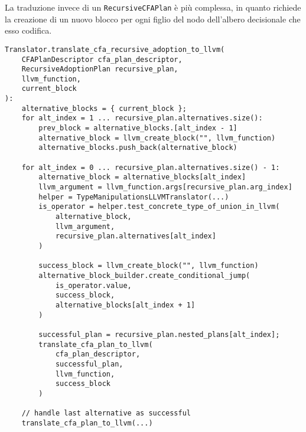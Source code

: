 La traduzione invece di un \texttt{RecursiveCFAPlan} è più complessa, in quanto
richiede la creazione di un nuovo blocco per ogni figlio del nodo dell'albero 
decisionale che esso codifica. \\

\vspace{0.4cm}
\begin{lstlisting}[frame=single]
Translator.translate_cfa_recursive_adoption_to_llvm(
    CFAPlanDescriptor cfa_plan_descriptor, 
    RecursiveAdoptionPlan recursive_plan,
    llvm_function,
    current_block
):
    alternative_blocks = { current_block };
    for alt_index = 1 ... recursive_plan.alternatives.size():
        prev_block = alternative_blocks.[alt_index - 1]
        alternative_block = llvm_create_block("", llvm_function)
        alternative_blocks.push_back(alternative_block)

    for alt_index = 0 ... recursive_plan.alternatives.size() - 1:
        alternative_block = alternative_blocks[alt_index]
        llvm_argument = llvm_function.args[recursive_plan.arg_index]
        helper = TypeManipulationsLLVMTranslator(...)
        is_operator = helper.test_concrete_type_of_union_in_llvm(
            alternative_block, 
            llvm_argument, 
            recursive_plan.alternatives[alt_index]
        )
        
        success_block = llvm_create_block("", llvm_function)
        alternative_block_builder.create_conditional_jump(
            is_operator.value, 
            success_block, 
            alternative_blocks[alt_index + 1]
        )

        successful_plan = recursive_plan.nested_plans[alt_index];
        translate_cfa_plan_to_llvm(
            cfa_plan_descriptor, 
            successful_plan, 
            llvm_function, 
            success_block
        )
    
    // handle last alternative as successful
    translate_cfa_plan_to_llvm(...)
\end{lstlisting}